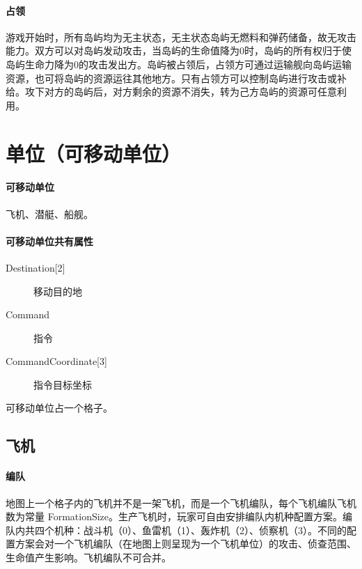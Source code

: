 \documentclass[11pt,a4paper]{article}
\begin{document}
      \paragraph{占领}
        游戏开始时，所有岛屿均为无主状态，无主状态岛屿无燃料和弹药储备，故无攻击能力。双方可以对岛屿发动攻击，当岛屿的生命值降为0时，岛屿的所有权归于使岛屿生命力降为0的攻击发出方。岛屿被占领后，占领方可通过运输舰向岛屿运输资源，也可将岛屿的资源运往其他地方。只有占领方可以控制岛屿进行攻击或补给。攻下对方的岛屿后，对方剩余的资源不消失，转为己方岛屿的资源可任意利用。


  \section{单位（可移动单位）}
    \paragraph{可移动单位} 飞机、潜艇、船舰。

    \paragraph{可移动单位共有属性}

    \begin{minipage}[t]{0.6\textwidth}
      \begin{description}
        \item[{Destination[2]}] 移动目的地
        \item[Command] 指令
        \item[{CommandCoordinate[3]}] 指令目标坐标
      \end{description}
    \end{minipage}

    可移动单位占一个格子。


    \subsection{飞机}
      \paragraph{编队}
        地图上一个格子内的飞机并不是一架飞机，而是一个飞机编队，每个飞机编队飞机数为常量 FormationSize。生产飞机时，玩家可自由安排编队内机种配置方案。编队内共四个机种：战斗机（0）、鱼雷机（1）、轰炸机（2）、侦察机（3）。不同的配置方案会对一个飞机编队（在地图上则呈现为一个飞机单位）的攻击、侦查范围、生命值产生影响。飞机编队不可合并。
\end{document}
